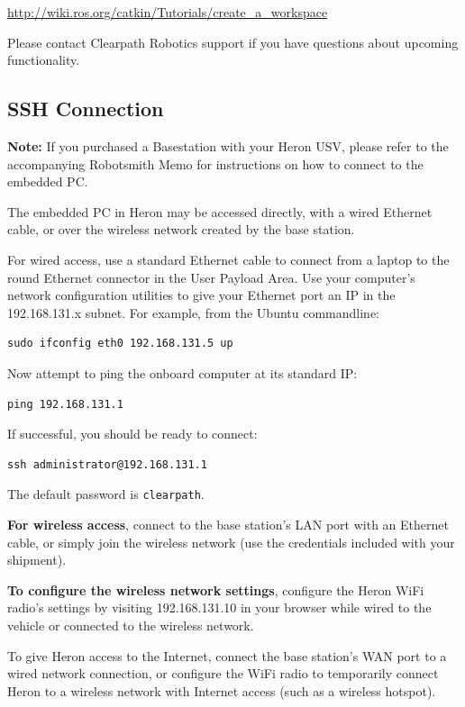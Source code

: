 \documentclass[]{clearpath-latex/clearpath-manual}
\begin{document}
\url{http://wiki.ros.org/catkin/Tutorials/create_a_workspace}

Please contact Clearpath Robotics support if you have questions about upcoming functionality.



\subsection{SSH Connection}

\textbf{Note:} If you purchased a Basestation with your Heron USV, please refer to the accompanying Robotsmith Memo for instructions on how to connect to the embedded PC.

The embedded PC in Heron may be accessed directly, with a wired Ethernet cable, or over the wireless network created by the base station.

For wired access, use a standard Ethernet cable to connect from a laptop to the round Ethernet connector in the User Payload Area. Use your computer’s network configuration utilities to give your Ethernet port an IP in the 192.168.131.x subnet. For example, from the Ubuntu commandline:

\begin{lstlisting}
sudo ifconfig eth0 192.168.131.5 up
\end{lstlisting}

Now attempt to ping the onboard computer at its standard IP:

\begin{lstlisting}
ping 192.168.131.1
\end{lstlisting}

If successful, you should be ready to connect:

\begin{lstlisting}
ssh administrator@192.168.131.1
\end{lstlisting}

The default password is \lstinline{clearpath}.


\textbf{For wireless access}, connect to the base station’s LAN port with an Ethernet cable, or simply join the wireless network (use the credentials included with your shipment).

\textbf{To configure the wireless network settings}, configure the Heron WiFi radio's settings by visiting 192.168.131.10 in your browser while wired to the vehicle or connected to the wireless network.


To give Heron access to the Internet, connect the base station’s WAN port to a wired network connection, or configure the WiFi radio to temporarily connect Heron to a wireless network with Internet access (such as a wireless hotspot).
\end{document}
